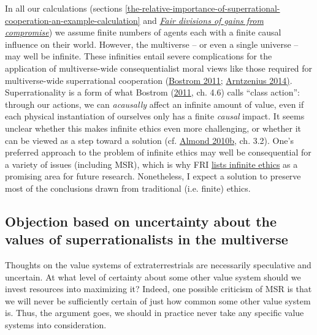 In all our calculations (sections
\ref{the-relative-importance-of-superrational-cooperation-an-example-calculation} and
\protect\hyperlink{_8pf5otrvp6f4}{\emph{Fair divisions of gains from compromise}}) we assume finite
numbers of agents each with a finite causal influence on their world. However, the multiverse -- or
even a single universe -- may well be infinite. These infinities entail severe complications for the
application of multiverse-wide consequentialist moral views like those required for
multiverse-wide superrational cooperation
(\href{http://www.nickbostrom.com/ethics/infinite.pdf}{Bostrom
2011;}
\href{http://lukemuehlhauser.com/wp-content/uploads/Arntzenius-Utilitarianism-decision-theory-and-eternity.pdf}{Arntzenius
2014)}. Superrationality is a form of what Bostrom
(\href{http://www.nickbostrom.com/ethics/infinite.pdf}{2011}, ch.
4.6) calls ``class action'': through our actions, we can
\emph{acausally} affect an infinite amount of value, even if each
physical instantiation of ourselves only has a finite \emph{causal}
impact. It seems unclear whether this makes infinite ethics even more
challenging, or whether it can be viewed as a step toward a solution
(cf.
\href{https://web.archive.org/web/20120310010225/http://www.paul-almond.com/Correlation2.pdf}{Almond
2010b}, ch. 3.2). One's preferred approach to the problem of infinite
ethics may well be consequential for a variety of issues (including
MSR), which is why FRI
\href{https://foundational-research.org/infinity-in-ethics/}{lists
infinite ethics} as a promising area for future research. Nonetheless,
I expect a solution to preserve most of the conclusions drawn from
traditional (i.e. finite) ethics.

\hypertarget{objection-based-on-uncertainty-about-the-values-of-superrationalists-in-the-multiverse}{\subsection{Objection
based on uncertainty about the values of superrationalists in the
multiverse}\label{objection-based-on-uncertainty-about-the-values-of-superrationalists-in-the-multiverse}}

Thoughts on the value systems of extraterrestrials are necessarily
speculative and uncertain. At what level of certainty about some other
value system should we invest resources into maximizing it? Indeed, one
possible criticism of MSR is that we will never be sufficiently certain
of just how common some other value system is. Thus, the argument goes,
we should in practice never take any specific value systems into
consideration.

